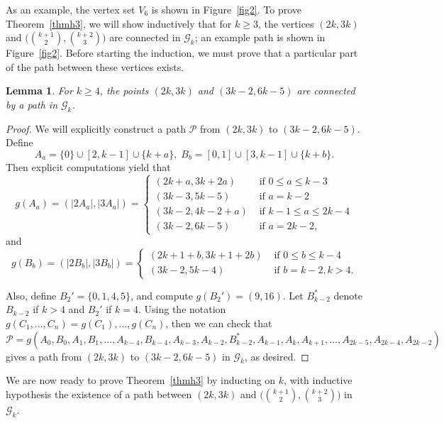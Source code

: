 \documentclass{daj}
\newtheorem{lemma}[theorem]{Lemma}
\theoremstyle{definition}
\theoremstyle{remark}
\numberwithin{equation}{section}
\numberwithin{theorem}{section}
\newcommand{\calg}{\mathcal{G}}
\begin{document}
As an example, the vertex set $V_6$ is shown in Figure~\ref{fig2}. To prove Theorem~\ref{thmh3}, we will show inductively that for $k \geq 3$, the vertices $(2k,3k)$ and $\big(\binom{k+1}{2},\binom{k+2}{3}\big)$ are connected in $\calg_k$; an example path is shown in Figure~\ref{fig2}. Before starting the induction, we must prove that a particular part of the path between these vertices exists.

\begin{lemma}\label{lemmanew}
    For $k \geq 4$, the points $(2k,3k)$ and $(3k-2,6k-5)$ are connected by a path in $\calg_k$.
\end{lemma}
\begin{proof}
    We will explicitly construct a path $\mathcal{P}$ from $(2k,3k)$ to $(3k-2,6k-5)$. Define \[A_{a} = \{0\} \cup[2,k-1]\cup\{k+a\}, \; B_b = [0,1] \cup [3,k-1] \cup \{k+b\}.\] Then explicit computations yield that \[g(A_{a}) = (|2A_{a}|,|3A_{a}|) = \begin{cases}
        (2k+a,3k+2a) &\text{ if } 0\leq a \leq k-3 \\
        (3k-3,5k-5) &\text{ if } a = k-2 \\
        (3k-2,4k-2 + a) &\text{ if } k-1 \leq a \leq 2k-4\\
        (3k-2,6k-5) &\text{ if } a = 2k-2,
    \end{cases}\]
    and 
    \[g(B_{b}) = (|2B_{b}|,|3B_b|) = \begin{cases}
        (2k+1+b,3k+1+2b) &\text{ if } 0 \leq b \leq k-4 \\
        (3k-2,5k-4) &\text{ if } b = k-2, k >4.
    \end{cases}\]

    Also, define $B_2' = \{0,1,4,5\}$, and compute $g(B_2') = (9,16)$. Let $B_{k-2}^*$ denote $B_{k-2}$ if $k > 4$ and $B_2'$ if $k = 4$. Using the notation $g(C_1,\ldots,C_n) = g(C_1),\ldots,g(C_n)$, then we can check that \[\mathcal{P} = g(A_0,B_0,A_1,B_1,\ldots,A_{k-4},B_{k-4},A_{k-3},A_{k-2},B_{k-2}^*,A_{k-1},A_k,A_{k+1},\ldots,A_{2k-5},A_{2k-4},A_{2k-2})\] gives a path from $(2k,3k)$ to $(3k-2,6k-5)$ in $\calg_k$, as desired.
\end{proof}

We are now ready to prove Theorem~\ref{thmh3} by inducting on $k$, with inductive hypothesis the existence of a path between $(2k,3k)$ and $\big(\binom{k+1}{2},\binom{k+2}{3}\big)$ in $\calg_k$.
\end{document}
